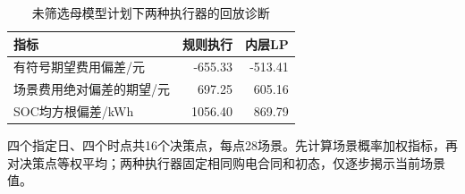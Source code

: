 \begin{table}[htbp]\centering\small
\caption{未筛选母模型计划下两种执行器的回放诊断}
\label{tab:v2_inner_gap}
\begin{tabularx}{\linewidth}{LRR}\toprule
指标 & 规则执行 & 内层LP\\\midrule
有符号期望费用偏差/元 & -655.33 & -513.41\\
场景费用绝对偏差的期望/元 & 697.25 & 605.16\\
SOC均方根偏差/kWh & 1056.40 & 869.79\\
\bottomrule\end{tabularx}
\par\smallskip\parbox{\linewidth}{\footnotesize 四个指定日、四个时点共16个决策点，每点28场景。先计算场景概率加权指标，再对决策点等权平均；两种执行器固定相同购电合同和初态，仅逐步揭示当前场景值。}
\end{table}
